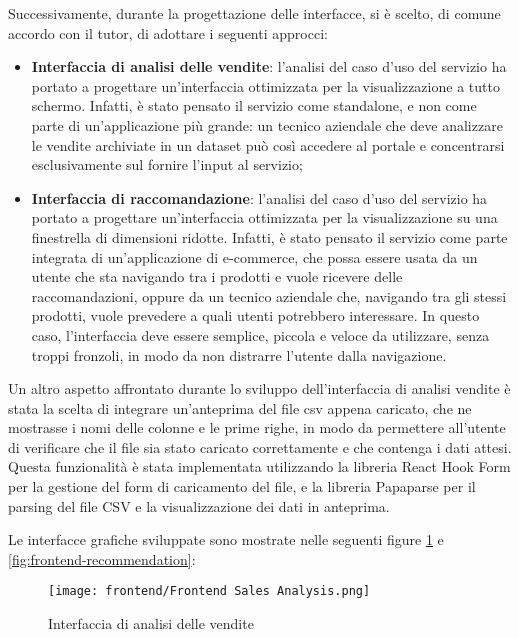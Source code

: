 Successivamente, durante la progettazione delle interfacce, si è scelto, di comune accordo con il tutor, di adottare i seguenti approcci:
\begin{itemize}
    \item \textbf{Interfaccia di analisi delle vendite}: l'analisi del caso d'uso del servizio ha portato a progettare un'interfaccia ottimizzata per la visualizzazione a tutto schermo. Infatti, è stato pensato il servizio come standalone, e non come parte di un'applicazione più grande: un tecnico aziendale che deve analizzare le vendite archiviate in un dataset può così accedere al portale e concentrarsi esclusivamente sul fornire l'input al servizio;
    \item \textbf{Interfaccia di raccomandazione}: l'analisi del caso d'uso del servizio ha portato a progettare un'interfaccia ottimizzata per la visualizzazione su una finestrella di dimensioni ridotte. Infatti, è stato pensato il servizio come parte integrata di un'applicazione di e-commerce, che possa essere usata da un utente che sta navigando tra i prodotti e vuole ricevere delle raccomandazioni, oppure da un tecnico aziendale che, navigando tra gli stessi prodotti, vuole prevedere a quali utenti potrebbero interessare. In questo caso, l'interfaccia deve essere semplice, piccola e veloce da utilizzare, senza troppi fronzoli, in modo da non distrarre l'utente dalla navigazione.
\end{itemize}

Un altro aspetto affrontato durante lo sviluppo dell'interfaccia di analisi vendite è stata la scelta di integrare un'anteprima del file csv appena caricato, che ne mostrasse i nomi delle colonne e le prime righe, in modo da permettere all'utente di verificare che il file sia stato caricato correttamente e che contenga i dati attesi. Questa funzionalità è stata implementata utilizzando la libreria React Hook Form per la gestione del form di caricamento del file, e la libreria Papaparse per il parsing del file CSV e la visualizzazione dei dati in anteprima.

Le interfacce grafiche sviluppate sono mostrate nelle seguenti figure \ref{fig:frontend-sales-analysis} e \ref{fig:frontend-recommendation}:

\begin{figure}[!h]
    \centering
    \texttt{[image: frontend/Frontend Sales Analysis.png]}
    \caption{Interfaccia di analisi delle vendite}
    \label{fig:frontend-sales-analysis}
\end{figure}

